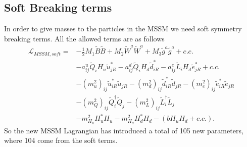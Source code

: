 \documentclass[twoside,english]{uiofysmaster}
\begin{document}
\subsection{Soft Breaking terms}

In order to give masses to the particles in the MSSM we need soft symmetry breaking terms. All the allowed terms are as follows
\begin{align}
\mathcal{L}_{MSSM, soft} =& - \frac{1}{2} M_1 \tilde{B} \tilde{B} + M_2 \tilde{W}^a \tilde{W}^a + M_3 \tilde{g}^a \tilde{g}^a + c.c.\\
&- a_{ij}^u \tilde{Q}_i H_u \tilde{u}_{jR}^* - a_{ij}^d \tilde{Q}_i H_d \tilde{d}_{iR}^* - a_{ij}^e \tilde{L}_i H_d \tilde{e}_{jR}^* + c.c.\\
& -(m_u^2)_{ij} \tilde{u}_{iR}^* \tilde{u}_{jR} - (m_d^2)_{ij} \tilde{d}_{iR}^* \tilde{d}_{jR} - (m_e^2)_{ij} \tilde{e}_{iR}^* \tilde{e}_{jR}\\
& - (m_Q^2)_{ij} \tilde{Q}_i^{\dagger} \tilde{Q}_j - (m_L^2)_{ij} \tilde{L}_i^{\dagger} \tilde{L}_j\\
& - m_{H_u}^2 H_u^*H_u - m_{H_d}^2 H_d^* H_d - (b H_u H_d + c.c.).
\end{align}
So the new MSSM Lagrangian has introduced a total of 105 new parameters, where 104 come from the soft terms.

%
\end{document}
